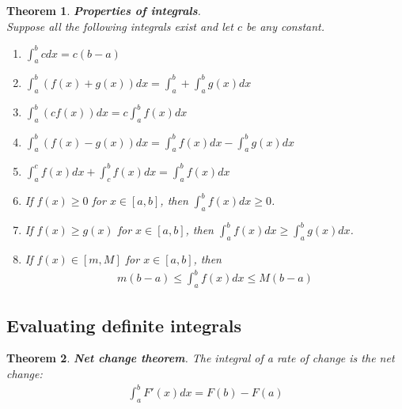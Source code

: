 \documentclass{article}
\theoremstyle{sltheorem}
\newtheorem{theorem}{Theorem}[section]
\begin{document}
\begin{theorem}
    \textbf{Properties of integrals}.\\
    Suppose all the following integrals exist and let $c$ be any constant.
    \begin{enumerate}
        \item $\int_a^b cdx = c(b-a)$
        \item $\int_a^b(f(x)+g(x))dx=\int_a^b+\int_a^bg(x)dx$
        \item $\int_a^b(cf(x))dx=c\int_a^bf(x)dx$
        \item $\int_a^b(f(x)-g(x))dx=\int_a^bf(x)dx-\int_a^bg(x)dx$
        \item $\int_a^cf(x)dx+\int_c^bf(x)dx = \int_a^bf(x)dx$
        \item If $f(x)\geq 0$ for $x\in[a,b]$, then $\int_a^b f(x)dx \geq 0$.
        \item If $f(x)\geq g(x)$ for $x\in[a,b]$, then $\int_a^b f(x)dx\geq \int_a^b g(x)dx$.
        \item If $f(x)\in[m,M]$ for $x\in[a,b]$, then 
        \begin{align*}
            m(b-a)\leq \int_a^b f(x)dx \leq M(b-a)
        \end{align*}
    \end{enumerate}
\end{theorem}
\subsection{Evaluating definite integrals}
\begin{theorem}
    \textbf{Net change theorem}. The integral of a rate of change is the net change:
    \begin{align*}
        \int_a^bF'(x)dx=F(b)-F(a)
    \end{align*}
\end{theorem}
\end{document}
